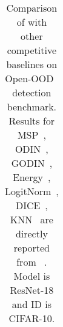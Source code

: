 \begin{table}[t!]
{\begin{tabular}{l*{6}c|*{10}c}
\end{tabular}}
\vspace{0.2cm}
\caption{\small Comparison of \name with other competitive baselines on Open-OOD~\cite{yang2022openood} detection benchmark. Results for MSP~\cite{hendrycks2016baseline}, ODIN~\cite{liang2018enhancing}, GODIN~\cite{hsu2020generalized}, Energy~\cite{liu2020energy}, LogitNorm~\cite{wei2022mitigating}, DICE~\cite{sun2022dice}, KNN~\cite{sun2022knn} are directly reported from ~\cite{yang2022openood}. Model is ResNet-18 and ID is CIFAR-10.}
\label{tab:openood_c10}
\end{table}